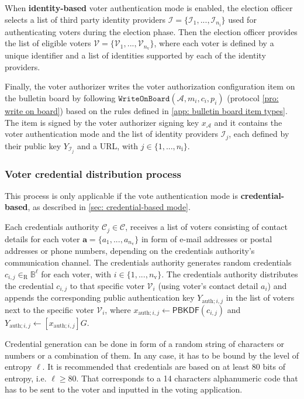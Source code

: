 When \textbf{identity-based} voter authentication mode is enabled, the election officer selects a list of third party identity providers $\boldsymbol{\mathcal{I}} = \{ \mathcal{I}_1, ..., \mathcal{I}_{n_\mathrm{i}} \}$ used for authenticating voters during the election phase. Then the election officer provides the list of eligible voters $\boldsymbol{\mathcal{V}} = \{ \mathcal{V}_1, ..., \mathcal{V}_{n_\mathrm{v}} \}$, where each voter is defined by a unique identifier and a list of identities supported by each of the identity providers.

Finally, the voter authorizer writes the voter authorization configuration item on the bulletin board by following $\mathtt{WriteOnBoard}(\mathcal{A}, m_i, c_i, p_i)$ (protocol \ref{pro: write on board}) based on the rules defined in \cref{app: bulletin board item types}. The item is signed by the voter authorizer signing key $x_\mathcal{A}$ and it contains the voter authentication mode and the list of identity providers $\mathcal{I}_j$, each defined by their public key $Y_{\mathcal{I}_j}$ and a URL, with $j \in \{ 1, ..., n_\mathrm{i} \}$.


\subsubsection{Voter credential distribution process} \label{sec: voter credential distribution process}
This process is only applicable if the vote authentication mode is \textbf{credential-based}, as described in \cref{sec: credential-based mode}.

Each credentials authority $\mathcal{C}_j \in \boldsymbol{\mathcal{C}}$, receives a list of voters consisting of contact details for each voter $\boldsymbol{a} = \{ a_1, ..., a_{n_\mathrm{v}} \}$ in form of e-mail addresses or postal addresses or phone numbers, depending on the credentials authority's communication channel. The credentials authority generates random credentials $c_{i, j} \in_\mathrm{R} \mathbb{B}^\ell$ for each voter, with $i \in \{ 1, ..., n_\mathrm{v} \}$. The credentials authority distributes the credential $c_{i, j}$ to that specific voter $\mathcal{V}_i$ (using voter's contact detail $a_i$) and appends the corresponding public authentication key $Y_{\mathrm{auth}; i, j}$ in the list of voters next to the specific voter $\mathcal{V}_i$, where $x_{\mathrm{auth}; i, j} \gets \mathsf{PBKDF}(c_{i, j})$ and $Y_{\mathrm{auth}; i, j} \gets [x_{\mathrm{auth}; i, j}]G$.

Credential generation can be done in form of a random string of characters or numbers or a combination of them. In any case, it has to be bound by the level of entropy $\ell$. It is recommended that credentials are based on at least 80 bits of entropy, i.e. $\ell \geq 80$. That corresponds to a 14 characters alphanumeric code that has to be sent to the voter and inputted in the voting application.

